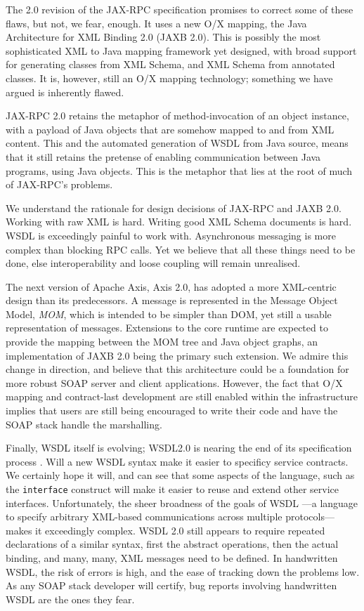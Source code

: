 The 2.0 revision of the JAX-RPC specification promises to correct some of these
flaws, but not, we fear, enough. It uses a new O/X mapping, the Java
Architecture for XML Binding 2.0 (JAXB 2.0)\cite{spec:JAX-B-20}. This is possibly the most
sophisticated XML to Java mapping framework yet designed, with broad support
for generating classes from XML Schema, and XML Schema from annotated classes.
It is, however, still an O/X mapping technology; something we have argued is
inherently flawed.  
 
JAX-RPC 2.0 retains the metaphor of method-invocation of an object instance, with
a payload of Java objects that are somehow mapped to and from XML content. This
and the automated generation of WSDL from Java source, means that it still
retains the pretense of enabling communication between Java programs, using Java
objects. This is the metaphor that lies at the root of much of JAX-RPC's
problems.

We understand the rationale for design decisions of JAX-RPC and JAXB 2.0. Working
with raw XML is hard. Writing good XML Schema documents is hard. WSDL is
exceedingly painful to work with. Asynchronous messaging is more complex than
blocking RPC calls. Yet we believe that all these things need to be done, else
interoperability and loose coupling will remain unrealised.

The next version of Apache Axis, Axis 2.0, has adopted a more XML-centric design
than its predecessors. A message is represented in the Message Object Model,
\emph{MOM}, which is intended to be simpler than DOM, yet still a usable
representation of messages. Extensions to the core runtime are expected to
provide the mapping between the MOM tree and Java object graphs, an
implementation of JAXB 2.0 being the primary such extension. We admire this
change in direction, and believe that this architecture could be a foundation
for more robust SOAP server and client applications. However, the fact that O/X
mapping and contract-last development are still enabled within the
infrastructure implies that users are still being encouraged to write their code
and have the SOAP stack handle the marshalling. 

Finally, WSDL itself is evolving; WSDL2.0 is nearing the end of its
specification process \cite{spec:WSDL-20}. Will a new WSDL syntax make it easier
to specificy service contracts. We certainly hope it will, and can see that some
aspects of the language, such as the {\tt interface} construct will make it
easier to reuse and extend other service interfaces. Unfortunately, the sheer
broadness of the goals of WSDL ---a language to specify arbitrary
XML-based communications across multiple protocols--- makes it exceedingly
complex. WSDL 2.0 still appears to require repeated declarations of a similar
syntax, first the abstract operations, then the actual binding, and many, many,
XML messages need to be defined. In handwritten WSDL, the risk of errors is
high, and the ease of tracking down the problems low. As any SOAP stack
developer will certify, bug reports involving handwritten WSDL are the ones they
fear. 

